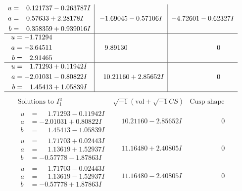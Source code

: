 \documentclass[1p]{elsarticle_modified}
\theoremstyle{definition}
\newcommand{\I}{\sqrt{-1}}
\begin{document}
$$\begin{array}{c|c|c}
\begin{aligned}
u &= \phantom{-}0.121737 - 0.263787 I \\
a &= \phantom{-}0.57633 + 2.28178 I \\
b &= \phantom{-}0.358359 + 0.939016 I\end{aligned}
 & -1.69045 - 0.57106 I & -4.72601 - 0.62327 I \\ \hline\begin{aligned}
u &= -1.71294\phantom{ +0.000000I} \\
a &= -3.64511\phantom{ +0.000000I} \\
b &= \phantom{-}2.91465\phantom{ +0.000000I}\end{aligned}
 & \phantom{-}9.89130\phantom{ +0.000000I} & \phantom{-0.000000 } 0 \\ \hline\begin{aligned}
u &= \phantom{-}1.71293 + 0.11942 I \\
a &= -2.01031 - 0.80822 I \\
b &= \phantom{-}1.45413 + 1.05839 I\end{aligned}
 & \phantom{-}10.21160 + 2.85652 I & \phantom{-0.000000 } 0\\
 \hline 
 \end{array}$$\newpage$$\begin{array}{c|c|c}  
\text{Solutions to }I^u_{1}& \I (\text{vol} + \sqrt{-1}CS) & \text{Cusp shape}\\
 \hline 
\begin{aligned}
u &= \phantom{-}1.71293 - 0.11942 I \\
a &= -2.01031 + 0.80822 I \\
b &= \phantom{-}1.45413 - 1.05839 I\end{aligned}
 & \phantom{-}10.21160 - 2.85652 I & \phantom{-0.000000 } 0 \\ \hline\begin{aligned}
u &= \phantom{-}1.71703 + 0.02443 I \\
a &= \phantom{-}1.13619 + 1.52937 I \\
b &= -0.57778 - 1.87863 I\end{aligned}
 & \phantom{-}11.16480 + 2.40805 I & \phantom{-0.000000 } 0 \\ \hline\begin{aligned}
u &= \phantom{-}1.71703 - 0.02443 I \\
a &= \phantom{-}1.13619 - 1.52937 I \\
b &= -0.57778 + 1.87863 I\end{aligned}
 & \phantom{-}11.16480 - 2.40805 I & \phantom{-0.000000 } 0 \\ \hline\begin{aligned}

\end{aligned}
\end{array}$$
\end{document}
